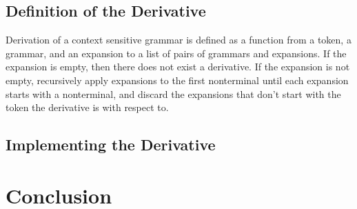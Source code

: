 \documentclass[letterpaper,12pt,draft]{article}
\begin{document}
\subsection{Definition of the Derivative}

Derivation of a context sensitive grammar is defined as a function from a token, a grammar, and an expansion to a list of pairs of grammars and expansions. If the expansion is empty, then there does not exist a derivative. If the expansion is not empty, recursively apply expansions to the first nonterminal until each expansion starts with a nonterminal, and discard the expansions that don't start with the token the derivative is with respect to.

\subsection{Implementing the Derivative}

\section{Conclusion}
\end{document}
